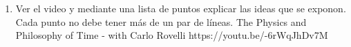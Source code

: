 \documentclass[12pt,a4paper]{report}
\begin{document}
\begin{enumerate}
{\begin{center}
			\end{center}
			
		}
		\item {
			Ver el video y mediante una lista de puntos explicar las ideas que se
			exponon. Cada punto no debe tener más de un par de líneas.
			The Physics and Philosophy of Time - with Carlo Rovelli https://youtu.be/-6rWqJhDv7M
		}
	\end{enumerate}
\end{document}
